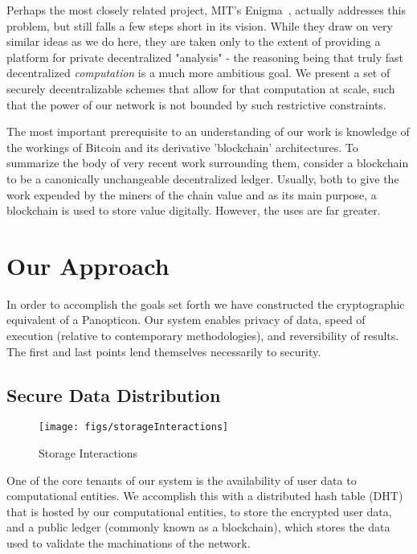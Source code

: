 \documentclass[journal]{IEEEtran}
\begin{document}
\par Perhaps the most closely related project, MIT's Enigma~\cite{Zyskind2015}, actually addresses this problem, but still falls a few steps short in its vision. While they draw on very similar ideas as we do here, they are taken only to the extent of providing a platform for private decentralized "analysis" - the reasoning being that truly fast decentralized \textit{computation} is a much more ambitious goal. We present a set of securely decentralizable schemes that allow for that computation at scale, such that the power of our network is not bounded by such restrictive constraints.

\par The most important prerequisite to an understanding of our work is knowledge of the workings of Bitcoin and its derivative 'blockchain' architectures. To summarize the body of very recent work surrounding them, consider a blockchain to be a canonically unchangeable decentralized ledger. Usually, both to give the work expended by the miners of the chain value and as its main purpose, a blockchain is used to store value digitally. However, the uses are far greater.

\section{Our Approach}
\par In order to accomplish the goals set forth we have constructed the cryptographic equivalent of a Panopticon. Our system enables privacy of data, speed of execution (relative to contemporary methodologies), and reversibility of results. The first and last points lend themselves necessarily to security.


\subsection{Secure Data Distribution}
\begin{figure}
  \centering
  \texttt{[image: figs/storageInteractions]}
  \caption{Storage Interactions}
  \label{storage}
\end{figure}
\par One of the core tenants of our system is the availability of user data to computational entities. We accomplish this with a distributed hash table (DHT) that is hosted by our computational entities, to store the encrypted user data, and a public ledger (commonly known as a blockchain), which stores the data used to validate the machinations of the network.
\end{document}
